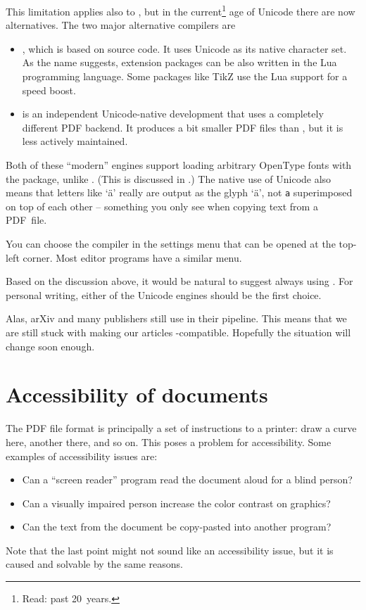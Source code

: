 This limitation applies also to ,
but in the current\footnote{Read: past 20~years.} age of Unicode there are now alternatives.
The two major alternative compilers are
\begin{itemize}
\item {}, which is based on  source code.
    It uses Unicode as its native character set.
    As the name suggests, extension packages can be also written in the Lua programming language.
    Some packages like TikZ use the Lua support for a speed boost.
\item {} is an independent Unicode-native development
    that uses a completely different PDF backend.
    It produces a bit smaller PDF files than ,
    but it is less actively maintained.
\end{itemize}

Both of these ``modern'' engines support loading arbitrary OpenType fonts
with the  package, unlike .
(This is discussed in .)
The native use of Unicode also means that letters like `ä'
really are output as the glyph `ä',
not \texttt{\textasciidieresis a} superimposed on top of each other
-- something you only see when copying text from a PDF~file.

\begin{overleaf}
You can choose the compiler in the settings menu that can be opened at the top-left corner.
Most editor programs have a similar menu.
\end{overleaf}

\begin{practices}
Based on the discussion above,
it would be natural to suggest always using .
For personal writing, either of the Unicode engines should be the first choice.

Alas, arXiv and many publishers still use  in their pipeline.
This means that we are still stuck with making our articles -compatible.
Hopefully the situation will change soon enough.
\end{practices}



%
%
%
\section{Accessibility of documents}

The PDF file format is principally a set of instructions to a printer:
draw a curve here, another there, and so on.
This poses a problem for accessibility.
Some examples of accessibility issues are:
%
\begin{itemize}
\item Can a ``screen reader'' program read the document aloud for a blind person?
\item Can a visually impaired person increase the color contrast on graphics?
\item Can the text from the document be copy-pasted into another program?
\end{itemize}
%
Note that the last point might not sound like an accessibility issue,
but it is caused and solvable by the same reasons.


